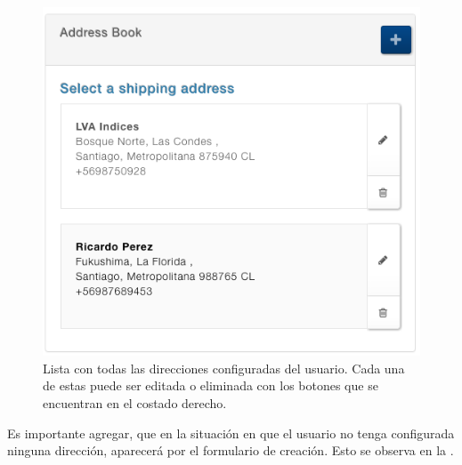 		\begin{figure}[h!]
			\centering
			\includegraphics[width=1\textwidth]{figuras/address/form/list_address.png}
			\caption{Lista con todas las direcciones configuradas del usuario. Cada una de estas puede ser editada o eliminada con los botones que se encuentran en el costado derecho.}
			\label{figure:address:form:list_address}
		\end{figure}

		Es importante agregar, que en la situación en que el usuario no tenga configurada ninguna dirección, aparecerá por  el formulario de creación. Esto se observa en la .

